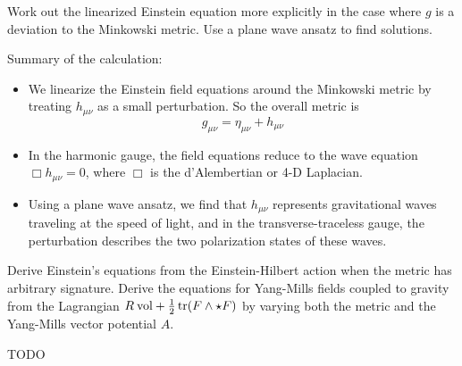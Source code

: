 \documentclass[10pt]{article}
\begin{document}
\begin{example}
	Work out the linearized Einstein equation more explicitly in the case where $g$ is a deviation to the Minkowski metric. Use a plane wave ansatz to find solutions.
\end{example}
\sol Summary of the calculation:
\begin{itemize}
	\item We linearize the Einstein field equations around the Minkowski metric by treating $h_{\mu\nu}$ as a small perturbation. So the overall metric is
	$$
	g_{\mu\nu} = \eta_{\mu\nu} + h_{\mu\nu}
	$$
	\item In the harmonic gauge, the field equations reduce to the wave equation $\Box h_{\mu\nu} = 0$, where $\Box$ is the d'Alembertian or 4-D Laplacian.
	\item Using a plane wave ansatz, we find that $h_{\mu\nu}$ represents gravitational waves traveling at the speed of light, and in the transverse-traceless gauge, the perturbation describes the two polarization states of these waves.
\end{itemize}


\begin{example}
	Derive Einstein's equations from the Einstein-Hilbert action when the metric has arbitrary signature. Derive the equations for Yang-Mills fields coupled to gravity from the Lagrangian $R\:\text{vol}+\frac12\tr(F\wedge\star F)$ by varying both the metric and the Yang-Mills vector potential $A$.
\end{example}
\sol TODO
\end{document}
